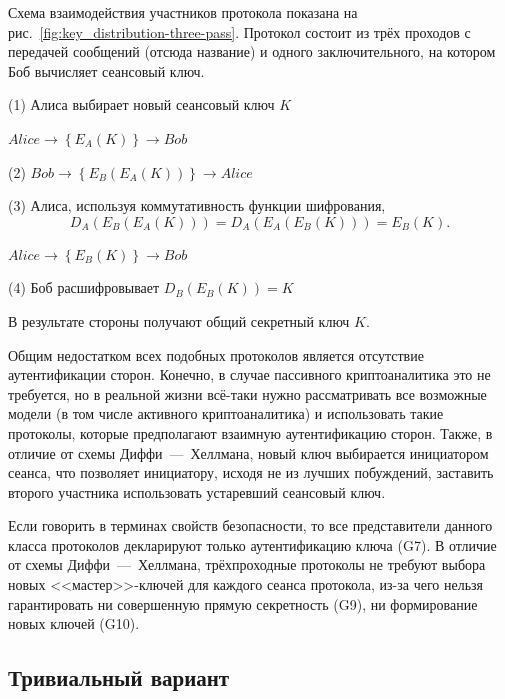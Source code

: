 Схема взаимодействия участников протокола показана на рис.~\ref{fig:key_distribution-three-pass}. Протокол состоит из трёх проходов с передачей сообщений (отсюда название) и одного заключительного, на котором Боб вычисляет сеансовый ключ.

\begin{protocol}
    \item[(1)] Алиса выбирает новый сеансовый ключ $K$
    \item[{}] $Alice \to \left\{ E_A \left( K \right) \right\} \to Bob$
    \item[(2)] $Bob \to \left\{ E_B \left( E_A \left( K \right) \right) \right\} \to Alice$
    \item[(3)] Алиса, используя коммутативность функции шифрования,
	\[ D_A \left( E_B \left( E_A \left( K \right) \right) \right) = D_A \left( E_A \left( E_B \left( K \right) \right) \right) = E_B \left( K \right). \]
    \item[{}] $Alice \to \left\{ E_B \left( K \right) \right\} \to Bob$
    \item[(4)] Боб расшифровывает $D_B \left( E_B \left( K \right) \right) = K$
\end{protocol}

В результате стороны получают общий секретный ключ $K$.

Общим недостатком всех подобных протоколов является отсутствие аутентификации сторон. Конечно, в случае пассивного криптоаналитика это не требуется, но в реальной жизни всё-таки нужно рассматривать все возможные модели (в том числе активного криптоаналитика) и использовать такие протоколы, которые предполагают взаимную аутентификацию сторон. Также, в отличие от схемы Диффи~---~Хеллмана, новый ключ выбирается инициатором сеанса, что позволяет инициатору, исходя не из лучших побуждений, заставить второго участника использовать устаревший сеансовый ключ.

Если говорить в терминах свойств безопасности, то все представители данного класса протоколов декларируют только аутентификацию ключа (G7). В отличие от схемы Диффи~---~Хеллмана, трёхпроходные протоколы не требуют выбора новых <<мастер>>-ключей для каждого сеанса протокола, из-за чего нельзя гарантировать ни совершенную прямую секретность (G9), ни формирование новых ключей (G10).

\subsection{Тривиальный вариант}


